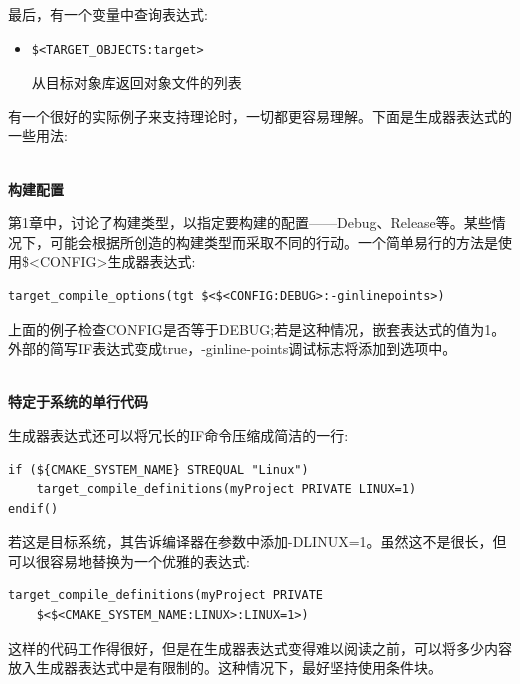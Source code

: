 最后，有一个变量中查询表达式:

\begin{itemize}
\item 
\begin{lstlisting}[style=styleCMake]
$<TARGET_OBJECTS:target> 
\end{lstlisting}

从目标对象库返回对象文件的列表
\end{itemize}


有一个很好的实际例子来支持理论时，一切都更容易理解。下面是生成器表达式的一些用法:

\hspace*{\fill} \\ %
\noindent
\textbf{构建配置}

第1章中，讨论了构建类型，以指定要构建的配置——Debug、Release等。某些情况下，可能会根据所创造的构建类型而采取不同的行动。一个简单易行的方法是使用\$<CONFIG>生成器表达式:

\begin{lstlisting}[style=styleCMake]
target_compile_options(tgt $<$<CONFIG:DEBUG>:-ginlinepoints>)
\end{lstlisting}

上面的例子检查CONFIG是否等于DEBUG;若是这种情况，嵌套表达式的值为1。外部的简写IF表达式变成true，-ginline-points调试标志将添加到选项中。

\hspace*{\fill} \\ %
\noindent
\textbf{特定于系统的单行代码}

生成器表达式还可以将冗长的IF命令压缩成简洁的一行:

\begin{lstlisting}[style=styleCMake]
if (${CMAKE_SYSTEM_NAME} STREQUAL "Linux")
	target_compile_definitions(myProject PRIVATE LINUX=1)
endif()
\end{lstlisting}

若这是目标系统，其告诉编译器在参数中添加-DLINUX=1。虽然这不是很长，但可以很容易地替换为一个优雅的表达式:

\begin{lstlisting}[style=styleCMake]
target_compile_definitions(myProject PRIVATE
	$<$<CMAKE_SYSTEM_NAME:LINUX>:LINUX=1>)
\end{lstlisting}

这样的代码工作得很好，但是在生成器表达式变得难以阅读之前，可以将多少内容放入生成器表达式中是有限制的。这种情况下，最好坚持使用条件块。

